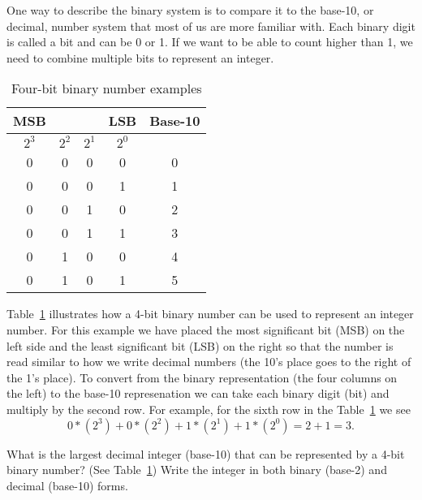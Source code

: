 One way to describe the binary system is to compare it to the base-10, or decimal, number system that most of us are more familiar with.  Each binary digit is called a \gls{bit} and can be 0 or 1.  If we want to be able to count higher than 1, we need to combine multiple bits to represent an integer.

\begin{table}[bt!] 
\renewcommand{\arraystretch}{1.2}
\caption{Four-bit binary number examples}
\label{t:binary}
\centering
\begin{tabular}{|c|c|c|c||c|}\hline
MSB &\hspace{4ex} & \hspace{4ex}& LSB & Base-10\\ \hline \hline
$2^3$ & $2^2$ & $2^1$ & $2^0$ & \\ \hline \hline
0 & 0 & 0 & 0 & 0 \\ \hline
0 & 0 & 0 & 1 & 1 \\ \hline
0 & 0 & 1 & 0 & 2 \\ \hline
0 & 0 & 1 & 1 & 3 \\ \hline
0 & 1 & 0 & 0 & 4 \\ \hline
0 & 1 & 0 & 1 & 5 \\ \hline
\end{tabular}
\end{table}

Table~\ref{t:binary} illustrates how a 4-bit binary number can be used to represent an integer number.  For this example we have placed the most significant bit (MSB) on the left side and the least significant bit (LSB) on the right so that the number is read similar to how we write decimal numbers (the 10's place goes to the right of the 1's place). To convert from the binary representation (the four columns on the left) to the base-10 represenation we can take each binary digit (bit) and multiply by the second row.  For example, for the sixth row in the Table~\ref{t:binary} we see
\[
0*(2^3)+0*(2^2)+1*(2^1)+1*(2^0) = 2+1 = 3.
\]

\begin{ex}
What is the largest decimal integer (base-10) that can be represented by a 4-bit binary number?  (See Table~\ref{t:binary})  Write the integer in both binary (base-2) and decimal (base-10) forms.
\end{ex}

\ifsolutions

